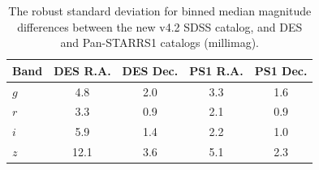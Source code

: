 \documentclass[fleqn,usenatbib]{mnras}
\begin{document}
   
\begin{table}
	\centering
	\begin{tabular}{l|c|c|c|c} %
		\hline
		Band & DES R.A. & DES Dec. & PS1 R.A. & PS1 Dec. \\
		\hline
       $g$        &        4.8    &      2.0   &        3.3    &      1.6        \\
       $r$         &        3.3    &      0.9   &        2.1    &      0.9         \\  
       $i$         &        5.9    &      1.4   &        2.2    &      1.0         \\ 
       $z$        &       12.1    &     3.6   &        5.1    &      2.3         \\ 
		\hline
	\end{tabular}
	\caption{The robust standard deviation for binned median magnitude differences between
the new v4.2 SDSS catalog, and DES and Pan-STARRS1 catalogs (millimag).}
	\label{tab:DESPS1}
\end{table}
\end{document}
